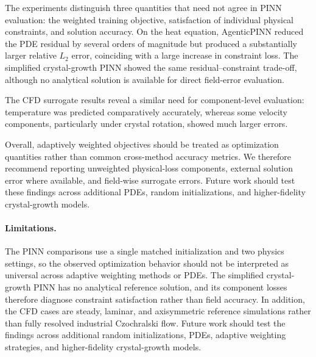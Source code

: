 \documentclass{article}
\begin{document}
The experiments distinguish three quantities that need not agree in PINN evaluation: the weighted training objective, satisfaction of individual physical constraints, and solution accuracy. On the heat equation, AgenticPINN reduced the PDE residual by several orders of magnitude but produced a substantially larger relative $L_2$ error, coinciding with a large increase in constraint loss. The simplified crystal-growth PINN showed the same residual--constraint trade-off, although no analytical solution is available for direct field-error evaluation. 

The CFD surrogate results reveal a similar need for component-level evaluation: temperature was predicted comparatively accurately, whereas some velocity components, particularly under crystal rotation, showed much larger errors. %

Overall, adaptively weighted objectives should be treated as optimization quantities rather than common cross-method accuracy metrics. We therefore recommend reporting unweighted physical-loss components, external solution error where available, and field-wise surrogate errors. Future work should test these findings across additional PDEs, random initializations, and higher-fidelity crystal-growth models.

\paragraph{Limitations.} The PINN comparisons use a single matched initialization and two physics settings, so the observed optimization behavior should not be interpreted as universal across adaptive weighting methods or PDEs. The simplified crystal-growth PINN has no analytical reference solution, and its component losses therefore diagnose constraint satisfaction rather than field accuracy. In addition, the CFD cases are steady, laminar, and axisymmetric reference simulations rather than fully resolved industrial Czochralski flow. Future work should test the findings across additional random initializations, PDEs, adaptive weighting strategies, and higher-fidelity crystal-growth models.



\end{document}
